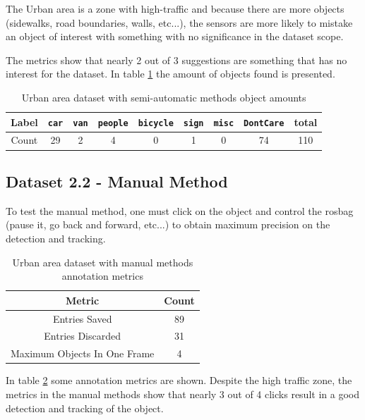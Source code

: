 The Urban area is a zone with high-traffic and because there are more objects (sidewalks, road boundaries, walls, etc...), the sensors are more likely to mistake an object of interest with something with no significance in the dataset scope. 

The metrics show that nearly 2 out of 3 suggestions are something that has no interest for the dataset. In table \ref{tab: urban1stats} the amount of objects found is presented.

\begin{table}[]
	\centering
	\caption{Urban area dataset  with semi-automatic methods object amounts}
	\label{tab: urban1stats}
	\begin{tabular}{c|c|c|c|c|c|c|c|c}
		\textbf{Label} & \texttt{car} & \texttt{van} & \texttt{people} & \texttt{bicycle} & \texttt{sign} & \texttt{misc} & \texttt{DontCare} & \textbf{total} \\ \hline
		Count          & 29           & 2            & 4               & 0                & 1             & 0             & 74                & 110           
	\end{tabular}
\end{table}


\subsection{Dataset 2.2 - Manual Method}

To test the manual method, one must click on the object and control the rosbag (pause it, go back and forward, etc...) to obtain maximum precision on the detection and tracking. 

\begin{table}[]
	\centering
	\caption{Urban area dataset with manual methods annotation metrics}
	\label{tab: urban2metrics}
	\begin{tabular}{c|c}
		\textbf{Metric}              & \textbf{Count} \\ \hline
		Entries Saved           & 89                      \\ \hline
		Entries Discarded            & 31                      \\ \hline
		Maximum Objects In One Frame & 4                 
	\end{tabular}
\end{table}

In table \ref{tab: urban2metrics} some annotation metrics are shown. Despite the high traffic zone, the metrics in the manual methods show that nearly 3 out of 4 clicks result in a good detection and tracking of the object. 

